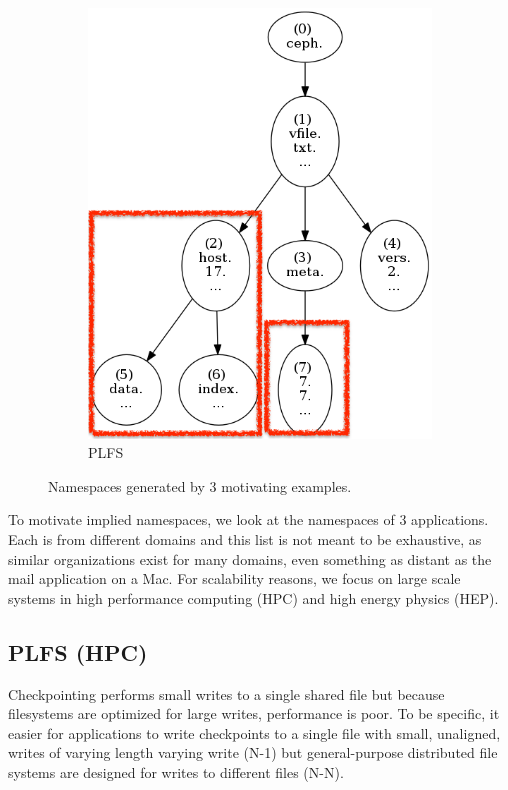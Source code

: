 \begin{figure}[t]
\begin{subfigure}[b]{.3\linewidth}
      \includegraphics[width=1.0\linewidth]{figures/tree_plfs.png}
      \caption{PLFS} \label{fig:plfs}
  \end{subfigure}
\caption{Namespaces generated by 3 motivating examples.\label{fig:use-cases}}
\end{figure}

To motivate implied namespaces, we look at the namespaces of 3 applications.
Each is from different domains and this list is not meant to be exhaustive, as
similar organizations exist for many domains, even something as distant as the
mail application on a Mac. For scalability reasons, we focus on large scale
systems in high performance computing (HPC) and high energy physics (HEP).

\subsection{PLFS (HPC)}
\label{sec:plfs}
Checkpointing performs small writes to a single shared file but because
filesystems are optimized for large writes, performance is poor. To be
specific, it easier for applications to write checkpoints to a single file with
small, unaligned, writes of varying length varying write (N-1) but
general-purpose distributed file systems are designed for writes to different
files (N-N).


